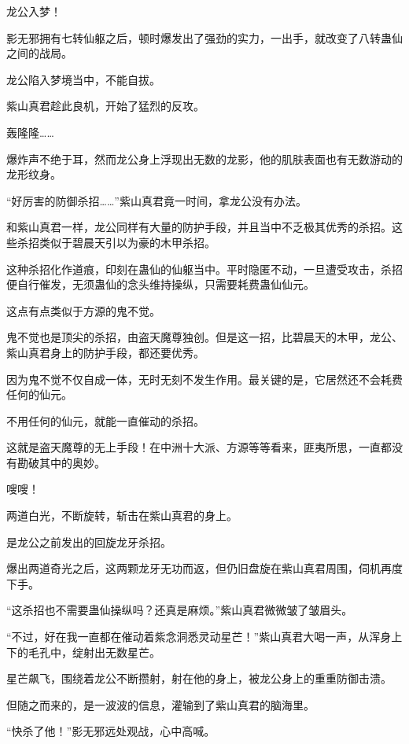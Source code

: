 
\begin{this_body}

龙公入梦！

影无邪拥有七转仙躯之后，顿时爆发出了强劲的实力，一出手，就改变了八转蛊仙之间的战局。

龙公陷入梦境当中，不能自拔。

紫山真君趁此良机，开始了猛烈的反攻。

轰隆隆……

爆炸声不绝于耳，然而龙公身上浮现出无数的龙影，他的肌肤表面也有无数游动的龙形纹身。

“好厉害的防御杀招……”紫山真君竟一时间，拿龙公没有办法。

和紫山真君一样，龙公同样有大量的防护手段，并且当中不乏极其优秀的杀招。这些杀招类似于碧晨天引以为豪的木甲杀招。

这种杀招化作道痕，印刻在蛊仙的仙躯当中。平时隐匿不动，一旦遭受攻击，杀招便自行催发，无须蛊仙的念头维持操纵，只需要耗费蛊仙仙元。

这点有点类似于方源的鬼不觉。

鬼不觉也是顶尖的杀招，由盗天魔尊独创。但是这一招，比碧晨天的木甲，龙公、紫山真君身上的防护手段，都还要优秀。

因为鬼不觉不仅自成一体，无时无刻不发生作用。最关键的是，它居然还不会耗费任何的仙元。

不用任何的仙元，就能一直催动的杀招。

这就是盗天魔尊的无上手段！在中洲十大派、方源等等看来，匪夷所思，一直都没有勘破其中的奥妙。

嗖嗖！

两道白光，不断旋转，斩击在紫山真君的身上。

是龙公之前发出的回旋龙牙杀招。

爆出两道奇光之后，这两颗龙牙无功而返，但仍旧盘旋在紫山真君周围，伺机再度下手。

“这杀招也不需要蛊仙操纵吗？还真是麻烦。”紫山真君微微皱了皱眉头。

“不过，好在我一直都在催动着紫念洞悉灵动星芒！”紫山真君大喝一声，从浑身上下的毛孔中，绽射出无数星芒。

星芒飙飞，围绕着龙公不断攒射，射在他的身上，被龙公身上的重重防御击溃。

但随之而来的，是一波波的信息，灌输到了紫山真君的脑海里。

“快杀了他！”影无邪远处观战，心中高喊。


\end{this_body}
